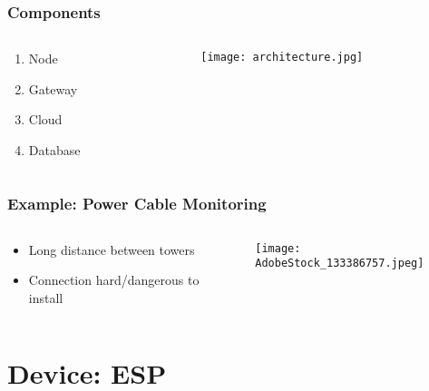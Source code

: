 \documentclass[compress, aspectratio=32]{beamer}
\begin{document}
\begin{frame}
    \frametitle{Components}
    \begin{columns}
        \begin{column}[]{0.4\textwidth}
            \begin{enumerate}
                \item Node
                \item Gateway
                \item Cloud
                \item Database
            \end{enumerate}            
        \end{column}
        \begin{column}{0.6\textwidth}
            \begin{figure}
                \texttt{[image: architecture.jpg]}
            \end{figure}
        \end{column}
    \end{columns}
\end{frame}

\begin{frame}
    \frametitle{Example: Power Cable Monitoring}
    \begin{columns}
        \begin{column}{0.4\textwidth}
            \begin{itemize}
                \item Long distance between towers
                \item Connection hard/dangerous to install
            \end{itemize}
        \end{column}
        \begin{column}{0.6\textwidth}
            \begin{figure}
                \texttt{[image: AdobeStock\_133386757.jpeg]}
            \end{figure}
        \end{column}
    \end{columns}
\end{frame}

\section{Device: ESP}
\end{document}
